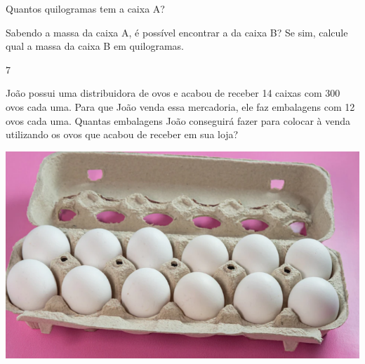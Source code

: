 \begin{escolha}
\item Quantos quilogramas tem a caixa A?\\

\item Sabendo a massa da caixa A, é possível encontrar a da caixa B? Se sim,
  calcule qual a massa da caixa B em quilogramas.\\

\end{escolha}

\num{7}

\begin{minipage}{.5\textwidth}
João possui uma distribuidora de ovos e acabou de receber 14 caixas
com 300 ovos cada uma. Para que João venda essa mercadoria, ele faz
embalagens com 12 ovos cada uma. Quantas embalagens João conseguirá
fazer para colocar à venda utilizando os ovos que acabou de receber em
sua loja?
\end{minipage}\hspace*{.5cm}
\begin{minipage}{.5\textwidth}
\includegraphics[width=\textwidth]{./imgs/mat3.png}
\end{minipage}

\begin{emptybox}

\vspace{4cm}
\end{emptybox}

